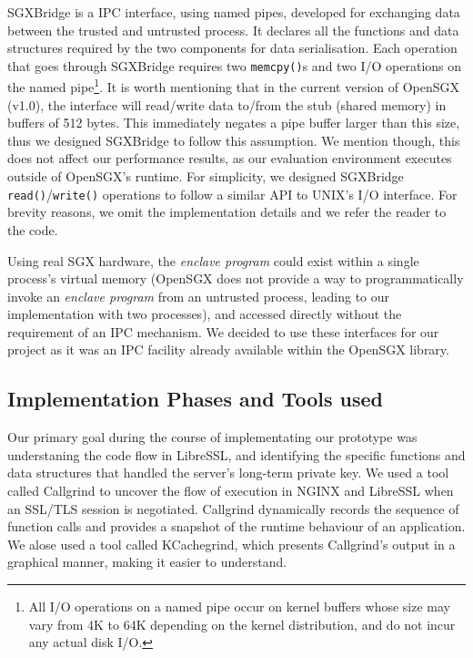 \documentclass[../main.tex]{subfiles}
\begin{document}
SGXBridge is a IPC interface, using named pipes, developed for
exchanging data between the trusted and untrusted process. It declares
all the functions and data structures required by the two components
for data serialisation. Each operation that goes through SGXBridge
requires two \texttt{memcpy()}s and two I/O operations on the named
pipe\footnote{All I/O operations on a named pipe occur on kernel
  buffers whose size may vary from 4K to 64K depending on the kernel
  distribution, and do not incur any actual disk I/O.}. It is worth
mentioning that in the current version of OpenSGX (v1.0), the
interface will read/write data to/from the stub (shared memory) in
buffers of 512 bytes. This immediately negates a pipe buffer larger
than this size, thus we designed SGXBridge to follow this assumption.
We mention though, this does not affect our performance results, as
our evaluation environment executes outside of OpenSGX's runtime. For
simplicity, we designed SGXBridge \texttt{read()}/\texttt{write()}
operations to follow a similar API to UNIX's I/O interface. For
brevity reasons, we omit the implementation details and we refer the
reader to the code.

Using real SGX hardware, the \textit{enclave program} could exist
within a single process's virtual memory (OpenSGX does not provide a
way to programmatically invoke an \textit{enclave program} from an
untrusted process, leading to our implementation with two processes),
and accessed directly without the requirement of an IPC mechanism. We
decided to use these interfaces for our project as it was an IPC
facility already available within the OpenSGX library.

\subsection{Implementation Phases and Tools used}
Our primary goal during the course of implementating our prototype was
understaning the code flow in LibreSSL, and identifying the specific
functions and data structures that handled the server's long-term
private key. We used a tool called Callgrind to uncover the flow of
execution in NGINX and LibreSSL when an SSL/TLS session is negotiated.
Callgrind dynamically records the sequence of function calls and
provides a snapshot of the runtime behaviour of an application. We
alose used a tool called KCachegrind, which presents Callgrind's output
in a graphical manner, making it easier to understand.
 
\end{document}
